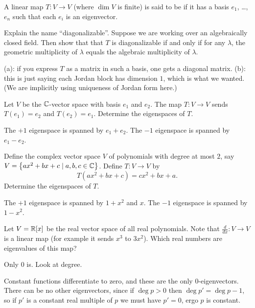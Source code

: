 \begin{problem}
	A linear map $T \colon V \to V$ (where $\dim V$ is finite)
	is said to be 
	if it has a basis $e_1$, \dots, $e_n$
	such that each $e_i$ is an eigenvector.
	\begin{enumerate}[(a)]
		\ii Explain the name ``diagonalizable''.
		\ii Suppose we are working over an algebraically closed field.
		Then show that that $T$ is diagonalizable if and only if
		for any $\lambda$, the geometric multiplicity of $\lambda$
		equals the algebraic multiplicity of $\lambda$.
	\end{enumerate}
	\begin{sol}
		(a): if you express $T$ as a matrix in such a basis,
		one gets a diagonal matrix.
		(b): this is just saying each Jordan block has dimension $1$,
		which is what we wanted.
		(We are implicitly using uniqueness of Jordan form here.)
	\end{sol}
\end{problem}

\begin{problem}
	[Switcharoo]
	Let $V$ be the $\mathbb C$-vector space
	with basis $e_1$ and $e_2$.
	The map $T \colon V \to V$ sends $T(e_1) = e_2$ and $T(e_2) = e_1$.
	Determine the eigenspaces of $T$.
	\begin{sol}
		The $+1$ eigenspace is spanned by $e_1+e_2$.
		The $-1$ eigenspace is spanned by $e_1-e_2$.
	\end{sol}
\end{problem}

\begin{problem}
	Define the complex vector space $V$
	of polynomials with degree at most $2$,
	say $V = \left\{ ax^2 + bx + c \mid a,b,c \in \mathbb C \right\}$.
	Define $T \colon V \to V$ by
	\[ T(ax^2+bx+c) = cx^2+bx+a. \]
	Determine the eigenspaces of $T$.
	\begin{sol}
		The $+1$ eigenspace is spanned by $1+x^2$ and $x$.
		The $-1$ eigenspace is spanned by $1-x^2$.
	\end{sol}
\end{problem}

\begin{problem}
	Let $V = \mathbb R[x]$ be the real vector space of all real polynomials.
	Note that $\frac{d}{dx} \colon V \to V$ is a linear map
	(for example it sends $x^3$ to $3x^2$).
	Which real numbers are eigenvalues of this map?
	\begin{hint}
		Only $0$ is.
		Look at degree.
	\end{hint}
	\begin{sol}
		Constant functions differentiate to zero,
		and these are the only $0$-eigenvectors.
		There can be no other eigenvectors,
		since if $\deg p > 0$ then $\deg p' = \deg p - 1$,
		so if $p'$ is a constant real multiple of $p$
		we must have $p' = 0$, ergo $p$ is constant.
	\end{sol}
\end{problem}

